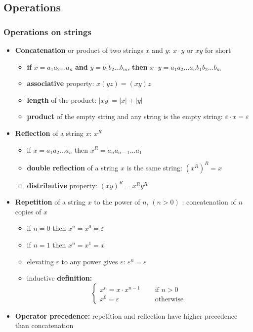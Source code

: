 \documentclass[english]{article}
\begin{document}
\subsection{Operations}

\subsubsection{Operations on strings}

\begin{itemize}
  \item \textbf{Concatenation} or product of two strings \(x\) and \(y\): \(x \cdot y\) or \(xy\) for short
        \begin{itemize}
          \item \textbf{if} \(x = a_1a_2\ldots a_n\) \textbf{and} \(y = b_1b_2\ldots b_m\), \textbf{then} \(x \cdot y = a_1a_2\ldots a_n b_1b_2\ldots b_m\)
          \item \textbf{associative} property: \(x  (y  z) = (x  y)  z\)
          \item \textbf{length} of the product: \(|x  y| = |x| + |y|\)
          \item \textbf{product} of the empty string and any string is the empty string: \(\varepsilon \cdot x = \varepsilon\)
        \end{itemize}
  \item \textbf{Reflection} of a string \(x\): \(x^R\)
        \begin{itemize}
          \item if \(x = a_1a_2\ldots a_n\) then \(x^R = a_na_{n-1}\ldots a_1\)
          \item \textbf{double reflection} of a string \(x\) is the same string: \(\left(x^R\right)^R = x\)
          \item \textbf{distributive} property: \((x y)^R = x^R y^R\)
        \end{itemize}
  \item \textbf{Repetition} of a string \(x\) to the power of \(n, \, (n > 0)\) : concatenation of \(n\) copies of \(x\)
        \begin{itemize}
          \item if \(n = 0\) then \(x^n = x^0 = \varepsilon\)
          \item if \(n = 1\) then \(x^n = x^1 = x\)
          \item elevating \(\varepsilon\) to any power gives \(\varepsilon\): \(\varepsilon^n = \varepsilon\)
          \item inductive \textbf{definition:} \[\begin{cases}
                    x ^ n = x \cdot x ^ {n - 1} \quad & \text{ if } n > 0  \\
                    x ^ 0 = \varepsilon \quad         & \text{ otherwise }
                  \end{cases}\]
        \end{itemize}
  \item \textbf{Operator precedence:} repetition and reflection have higher precedence than concatenation
\end{itemize}
\end{document}
